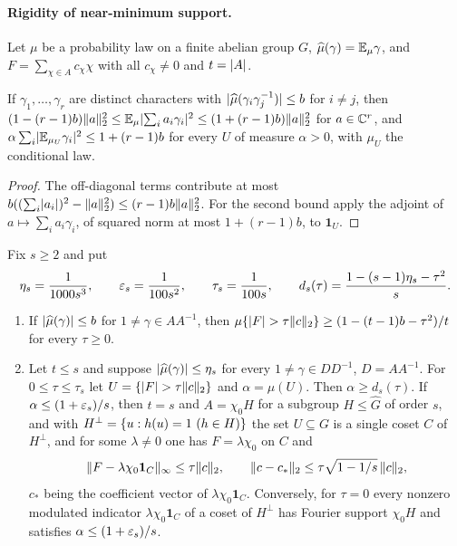 \paragraph{Rigidity of near-minimum support.}
Let $\mu$ be a probability law on a finite abelian group $G$, $\widehat\mu(\gamma)=\mathbb{E}_\mu\gamma$, and
$F=\sum_{\chi\in A}c_\chi\chi$ with all $c_\chi\ne0$ and $t=\lvert A\rvert$.

\begin{lemma}\label{dir:lem:codegram}
If $\gamma_1,\dots,\gamma_r$ are distinct characters with $\lvert\widehat\mu(\gamma_i\gamma_j^{-1})\rvert\le b$ for $i\ne j$,
then $(1-(r-1)b)\lVert a\rVert_2^2\le\mathbb{E}_\mu\lvert\sum_ia_i\gamma_i\rvert^2\le(1+(r-1)b)\lVert a\rVert_2^2$ for $a\in\mathbb{C}^r$, and
$\alpha\sum_i\lvert\mathbb{E}_{\mu_U}\gamma_i\rvert^2\le1+(r-1)b$ for every $U$ of measure $\alpha>0$, with $\mu_U$ the
conditional law.
\end{lemma}

\begin{proof}
The off-diagonal terms contribute at most $b((\sum_i\lvert a_i\rvert)^2-\lVert a\rVert_2^2)\le(r-1)b\lVert a\rVert_2^2$. For the second
bound apply the adjoint of $a\mapsto\sum_ia_i\gamma_i$, of squared norm at most $1+(r-1)b$, to $\mathbf 1_U$.
\end{proof}

Fix $s\ge2$ and put
\[
 \eta_s=\frac1{1000s^3},\qquad\varepsilon_s=\frac1{100s^2},\qquad\tau_s=\frac1{100s},\qquad
 d_s(\tau)=\frac{1-(s-1)\eta_s-\tau^2}s .
\]

\begin{theorem}\label{dir:thm:rigid}
\begin{enumerate}[label=\textup{(\alph*)}]
\item If $\lvert\widehat\mu(\gamma)\rvert\le b$ for $1\ne\gamma\in AA^{-1}$, then
$\mu\{\lvert F\rvert>\tau\lVert c\rVert_2\}\ge(1-(t-1)b-\tau^2)/t$ for every $\tau\ge0$.
\item Let $t\le s$ and suppose $\lvert\widehat\mu(\gamma)\rvert\le\eta_s$ for every $1\ne\gamma\in DD^{-1}$, $D=AA^{-1}$.
For $0\le\tau\le\tau_s$ let $U=\{\lvert F\rvert>\tau\lVert c\rVert_2\}$ and $\alpha=\mu(U)$. Then $\alpha\ge d_s(\tau)$. If
$\alpha\le(1+\varepsilon_s)/s$, then $t=s$ and $A=\chi_0H$ for a subgroup $H\le\widehat G$ of order $s$, and with
$H^\perp=\{u:h(u)=1\ (h\in H)\}$ the set $U\subseteq G$ is a single coset $C$ of $H^\perp$, and for some
$\lambda\ne0$ one has $F=\lambda\chi_0$ on $C$ and
\[
 \lVert F-\lambda\chi_0\mathbf 1_C\rVert_{\infty}\le\tau\lVert c\rVert_2,\qquad\lVert c-c_*\rVert_2\le\tau\sqrt{1-1/s}\,\lVert c\rVert_2,
\]
$c_*$ being the coefficient vector of $\lambda\chi_0\mathbf 1_C$. Conversely, for $\tau=0$ every nonzero
modulated indicator $\lambda\chi_0\mathbf 1_C$ of a coset of $H^\perp$ has Fourier support $\chi_0H$ and
satisfies $\alpha\le(1+\varepsilon_s)/s$.
\end{enumerate}
\end{theorem}

